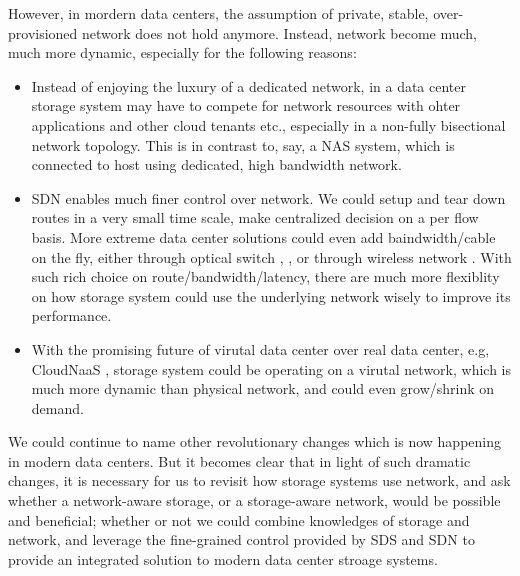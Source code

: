 However, in mordern data centers, the assumption of private, stable, over-provisioned network does not hold anymore. Instead, network become much, much more dynamic, especially for the following reasons:


\begin{itemize}
\item{}
       	Instead of enjoying the luxury of a dedicated network, in a data center storage system may have to compete for network resources with ohter applications and other cloud tenants etc., especially in a non-fully bisectional network topology. This is in contrast to, say, a NAS system, which is connected to host using dedicated, high bandwidth network. 

\item {}
SDN enables much finer control over network. We could setup and tear down routes in a very small time scale, make centralized decision on a per flow basis. More extreme data center solutions could even add baindwidth/cable on the fly, either through optical switch \cite{c-through}, \cite{helios}, or through wireless network \cite{flyaways}. With such rich choice on route/bandwidth/latency, there are much more flexiblity on how storage system could use the underlying network wisely to improve its performance.

\item {}
With the promising future of virutal data center over real data center, e.g, CloudNaaS \cite{cloud-naas}, storage system could be operating on a virutal network, which is much more dynamic than physical network, and could even grow/shrink on demand.

\end{itemize}

We could continue to name other revolutionary changes which is now happening in modern data centers. But it becomes clear that in light of such dramatic changes, it is necessary for us to revisit how storage systems use network, and ask whether a network-aware storage, or a storage-aware network, would be possible and beneficial; whether or not we could combine knowledges of storage and network, and leverage the fine-grained control provided by SDS and SDN to provide an integrated solution to modern data center stroage systems.

